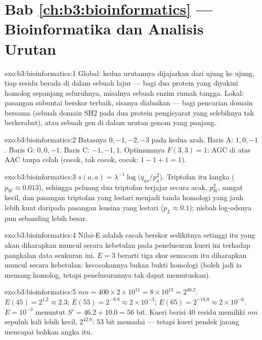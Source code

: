 \section*{Bab \ref{ch:b3:bioinformatics} --- Bioinformatika dan Analisis Urutan}

\begin{solution}{exo:b3:bioinformatics:1}
Global: kedua urutannya dijajarkan dari ujung ke ujung, tiap residu berada di
dalam sebuah lajur --- bagi dua protein yang diyakini homolog sepanjang
seluruhnya, misalnya  sebuah enzim rumah tangga. Lokal: pasangan
subuntai berskor terbaik, sisanya diabaikan --- bagi pencarian domain bersama
(sebuah domain SH2 pada dua protein pengisyarat yang selebihnya tak
berkerabat), atau sebuah gen di dalam urutan genom yang panjang.
\end{solution}

\begin{solution}{exo:b3:bioinformatics:2}
Batasnya $0,-1,-2,-3$ pada kedua arah. Baris A: $1, 0, -1$. Baris G: $0, 0, -1$.
Baris C: $-1, -1, 1$. Optimumnya $F(3,3) = 1$: AGC di atas AAC tanpa celah
(cocok, tak cocok, cocok: $1 - 1 + 1 = 1$).
\end{solution}

\begin{solution}{exo:b3:bioinformatics:3}
$s(a,a) = \lambda^{-1}\log\bigl(q_{aa}/p_{a}^{2}\bigr)$. Triptofan itu
langka ($p_{W} \approx 0.013$), sehingga peluang dua triptofan terjajar
secara acak, $p_{W}^{2}$, sangat kecil, dan pasangan triptofan yang lestari
menjadi tanda homologi yang jauh lebih kuat daripada pasangan leusina yang
lestari ($p_{L}
\approx 0.1$); nisbah log-odsnya pun sebanding lebih besar.
\end{solution}

\begin{solution}{exo:b3:bioinformatics:4}
Nilai-E adalah cacah  berskor sedikitnya setinggi itu
yang akan diharapkan muncul secara kebetulan pada penelusuran kueri ini
terhadap pangkalan data seukuran ini. $E = 3$ berarti tiga skor semacam itu
diharapkan muncul secara kebetulan: kecocokannya bukan bukti homologi (boleh
jadi ia memang homolog, tetapi penelusurannya tak dapat memutuskan).
\end{solution}

\begin{solution}{exo:b3:bioinformatics:5}
$mn = 400\times 2\times 10^{11} = 8\times 10^{13} = 2^{46.2}$. $E(45) =
2^{1.2} \approx 2.3$; $E(55) = 2^{-8.8} \approx 2\times 10^{-3}$;
$E(65) = 2^{-18.8} \approx 2\times 10^{-6}$. $E = 10^{-3}$ menuntut $S' =
46.2 + 10.0 = 56$ bit. Kueri berisi \num{40} residu memiliki $mn$ sepuluh kali
lebih kecil, $2^{42.9}$: $53$ bit memadai --- tetapi kueri pendek jarang
mencapai bahkan angka itu.
\end{solution}

